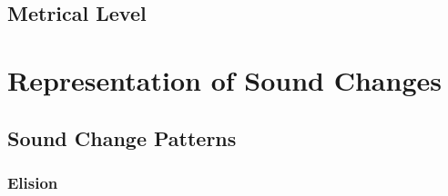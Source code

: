 \documentclass{report}[12pt]
\begin{document}
\subsection{Metrical Level}

\section{Representation of Sound Changes}

\subsection{Sound Change Patterns}

\subsubsection{Elision}\label{sec:elision_lam}
\end{document}
